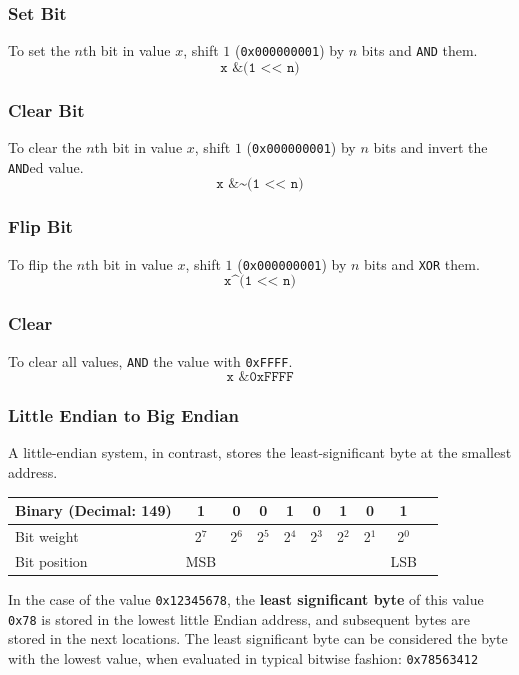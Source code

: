 \documentclass[11pt]{article}
\begin{document}
\subsubsection{Set Bit}
To set the $n$th bit in value $x$, shift $1$ (\texttt{0x000000001}) by $n$ bits and \texttt{AND} them.
$$\texttt{x \& (1 << n)}$$
\subsubsection{Clear Bit}
To clear the $n$th bit in value $x$, shift $1$ (\texttt{0x000000001}) by $n$ bits and invert the \texttt{AND}ed value.
$$\texttt{x \& \textasciitilde(1 << n)}$$
\subsubsection{Flip Bit}
To flip the $n$th bit in value $x$, shift $1$ (\texttt{0x000000001}) by $n$ bits and \texttt{XOR} them.
$$\texttt{x\textasciicircum  (1 << n)}$$
\subsubsection{Clear}
To clear all values, \texttt{AND} the value with \texttt{0xFFFF}.
$$\texttt{x \&  0xFFFF}$$
\subsubsection{Little Endian to Big Endian}
A little-endian system, in contrast, stores the least-significant byte at the smallest address.

\begin{center}
    \begin{tabular}{ | l | c | c | c | c | c | c | c | c | c | } 
    \hline
    Binary (Decimal: 149) & 1 & 0 & 0 & 1 & 0 & 1 & 0 & 1 \\ 
    \hline
    Bit weight & 2$^7$ & 2$^6$ & 2$^5$ & 2$^4$ & 2$^3$ & 2$^2$ & 2$^1$ & 2$^0$ \\ 
    \hline
    Bit position & MSB & & & & & & & LSB \\ 
    \hline
    \end{tabular}
    \end{center}

In the case of the value \texttt{0x12345678}, the \textbf{least significant byte} of this value \texttt{0x78} is stored in the lowest little Endian address, and subsequent bytes are stored in the next locations. The least significant byte can be considered the byte with the lowest value, when evaluated in typical bitwise fashion: \texttt{0x78563412}
\end{document}

